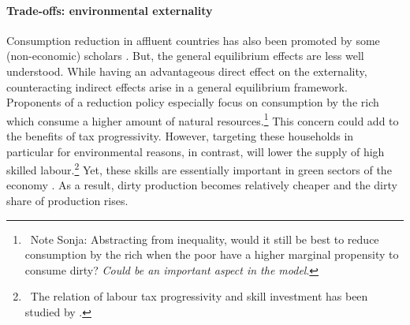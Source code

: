 % 


\paragraph{Trade-offs: environmental externality} Consumption reduction in affluent countries has also been promoted by some (non-economic) scholars \citep{Schor2005SustainableReduction, Pullinger2014WorkingDesign, Arrow2004AreMuch}. But, the general equilibrium effects are less well understood.
While having an advantageous direct effect on the externality, counteracting indirect effects arise in a general equilibrium framework. Proponents of a reduction policy especially focus on consumption by the rich which consume a higher amount of natural resources.\footnote{\ Note Sonja: Abstracting from inequality, would it still be best to reduce consumption by the rich when the poor have a higher marginal propensity to consume dirty? \textit{Could be an important aspect in the model}.}
This concern could add to the benefits of tax progressivity.
However, targeting these households in particular for environmental reasons, in contrast, will lower the supply of high skilled labour.\footnote{\ The relation of labour tax progressivity and skill investment has been studied by \cite{Heathcote2017OptimalFramework}.} Yet, these skills are essentially important in green sectors of the economy \citep{Consoli2016DoCapital}. As a result, dirty production becomes relatively cheaper and the dirty share of production rises. 

